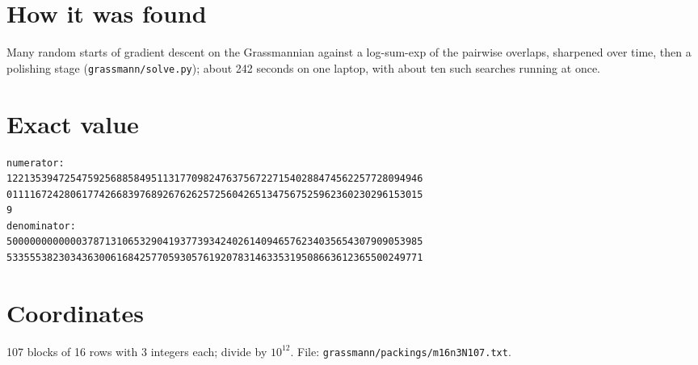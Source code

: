 \documentclass[11pt,a4paper]{article}
\begin{document}
\section{How it was found}
Many random starts of gradient descent on the Grassmannian against a log-sum-exp of the pairwise overlaps, sharpened over time, then a polishing stage (\texttt{grassmann/solve.py}); about 242 seconds on one laptop, with about ten such searches running at once.


\appendix
\section{Exact value}
{\small
\begin{verbatim}
numerator:
122135394725475925688584951131770982476375672271540288474562257728094946
011116724280617742668397689267626257256042651347567525962360230296153015
9
denominator:
500000000000037871310653290419377393424026140946576234035654307909053985
533555382303436300616842577059305761920783146335319508663612365500249771
\end{verbatim}}

\section{Coordinates}
107 blocks of 16 rows with 3 integers each; divide by $10^{12}$. File: \texttt{grassmann/packings/m16n3N107.txt}.
{\tiny
\begin{multicols}{3}
\end{multicols}}
\end{document}
